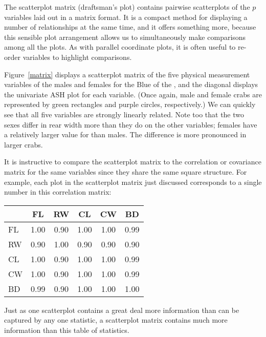 
The scatterplot matrix (draftsman's plot) contains pairwise
scatterplots of the $p$ variables laid out in a matrix format.  It is
a compact method for displaying a number of relationships at the same
time, and it offers something more, because this sensible plot
arrangement allows us to simultaneously make comparisons among all the
plots.  As with parallel coordinate plots, it is often useful to
re-order variables to highlight comparisons.

Figure~\ref{matrix} displays a scatterplot matrix of the five physical
measurement variables of the males and females for the Blue
 of the , and the diagonal
displays the univariate ASH plot for each variable.  (Once again, male
and female crabs are represented by green rectangles and purple
circles, respectively.)  We can quickly see that all five variables are
strongly linearly related.  Note too that the two sexes differ in rear
width more than they do on the other variables; females have a
relatively larger value for  than males.  The
difference is more pronounced in larger crabs.

It is instructive to compare the scatterplot matrix to the
correlation or covariance matrix for the same variables since they
share the same square structure.  For example, each plot in the
scatterplot matrix just discussed corresponds to a single number
in this correlation matrix:

\smallskip
\begin{center}
\begin{tabular}{l@{\hspace{.3em}}|@{\hspace{.3em}}ccccc}
&     FL \T \B &  RW &  CL &  CW &  BD\\
\hline
FL \T & 1.00 & 0.90 & 1.00 & 1.00 & 0.99\\
RW & 0.90 & 1.00 & 0.90 & 0.90 & 0.90\\
CL & 1.00 & 0.90 & 1.00 & 1.00 & 0.99\\
CW & 1.00 & 0.90 & 1.00 & 1.00 & 0.99\\
BD \B & 0.99 & 0.90 & 1.00 & 1.00 & 1.00
\end{tabular}
\end{center}
\smallskip

\noindent Just as one scatterplot contains a great deal more
information than can be captured by any one statistic, a scatterplot
matrix contains much more information than this table of statistics.

